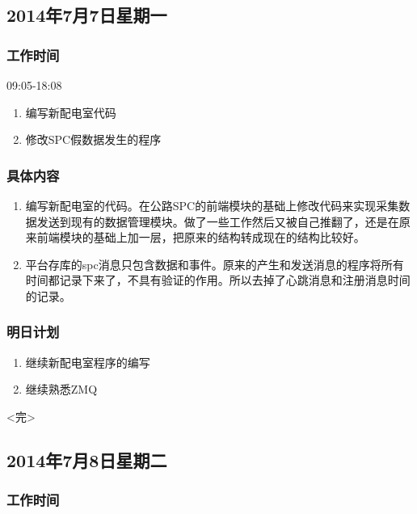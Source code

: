 \documentclass[11pt]{article}
\begin{document}
\subsection{2014年7月7日星期一}
\subsubsection{工作时间}

  09:05-18:08

  \begin{enumerate}
  \item 编写新配电室代码
  \item 修改SPC假数据发生的程序
  \end{enumerate}
\subsubsection{具体内容}
  \begin{enumerate}
  \item 编写新配电室的代码。在公路SPC的前端模块的基础上修改代码来实现采集数据发送到现有的数据管理模块。做了一些工作然后又被自己推翻了，还是在原来前端模块的基础上加一层，把原来的结构转成现在的结构比较好。
  \item 平台存库的spc消息只包含数据和事件。原来的产生和发送消息的程序将所有时间都记录下来了，不具有验证的作用。所以去掉了心跳消息和注册消息时间的记录。
  \end{enumerate}
\subsubsection{明日计划}
  \begin{enumerate}
  \item 继续新配电室程序的编写
  \item 继续熟悉ZMQ
  \end{enumerate}

\begin{center}
  <完>
\end{center}

\newpage

\subsection{2014年7月8日星期二}

\subsubsection{工作时间}
\end{document}
